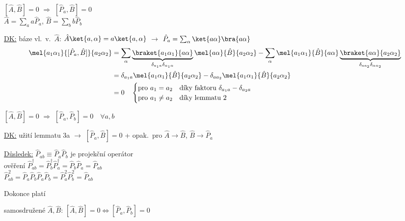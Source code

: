 \documentclass[11pt,a4paper]{article}
\begin{document}
\begin{veta}[Lemma 3a]
$[\hat A,\hat B] = 0$ \quad $\Rightarrow$ \quad $[\hat P_a,\hat B] = 0$ \\
\quad $\hat A = \sum_a a\hat P_a$, \qquad $\hat B = \sum_b b\hat P_b$
\end{veta}

\underline{DK:} báze vl.\ v.\ $\hat A$: \quad $\hat A\ket{a,\alpha} = a\ket{a,\alpha}$ \quad $\to$ \quad $\hat P_a = \sum_\alpha\ket{a\alpha}\bra{a\alpha}$
\begin{align*}
  \mel{a_1\alpha_1}{[\hat P_a,\hat B]}{a_2\alpha_2}
  &= \sum_\alpha\underbrace{\braket{a_1\alpha_1}{a\alpha}}_{\delta_{a_1a}\delta_{\alpha_1\alpha}}\mel{a\alpha}{\hat B}{a_2\alpha_2}
   - \sum_\alpha\mel{a_1\alpha_1}{\hat B}{a\alpha}\underbrace{\braket{a\alpha}{a_2\alpha_2}}_{\delta_{aa_2}\delta_{\alpha\alpha_2}} \\
  &= \delta_{a_1a}\mel{a_1\alpha_1}{\hat B}{a_2\alpha_2} - \delta_{aa_2}\mel{a_1\alpha_1}{\hat B}{a_2\alpha_2} \\
  &= 0 \quad \begin{cases}
       \text{pro } a_1 = a_2 & \text{díky faktoru } \delta_{a_1a} - \delta_{a_2a} \\
       \text{pro } a_1\neq a_2 & \text{díky lemmatu 2}
     \end{cases}
\end{align*}

\begin{veta}[Lemma 3]
$[\hat A,\hat B] = 0$ \quad $\Rightarrow$ \quad $[\hat P_a,\hat P_b] = 0 \quad \forall a,b$
\end{veta}

\underline{DK:} užití lemmatu 3a $\to$ $[\hat P_a,\hat B] = 0$ + opak.\ pro $\hat A\to\hat B$, $\hat B\to\hat P_a$

\underline{Důsledek:} \quad $\hat P_{ab} \equiv \hat P_a\hat P_b$ je projekční operátor \\
\quad ověření \quad $\hat P_{ab}^\dagger = \hat P_b^\dagger\hat P_a^\dagger = \hat P_b\hat P_a = \hat P_{ab}$ \\
\quad \phantom{ověření} \quad $\hat P_{ab}^2 = \hat P_a\hat P_b\hat P_a\hat P_b = \hat P_a^2\hat P_b^2 = \hat P_{ab}$

Dokonce platí

\begin{veta}[VĚTA]
samosdružené $\hat A,\hat B$: \quad $[\hat A,\hat B] = 0 \Leftrightarrow [\hat P_a,\hat P_b] = 0$
\end{veta}
\end{document}
